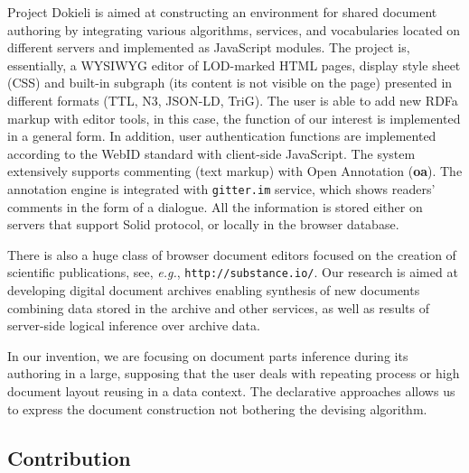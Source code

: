 \documentclass[conference,a4paper]{IEEEtran}
\providecommand\url[1]{\texttt{#1}}
\begin{document}
Project Dokieli \cite{b14} is aimed at constructing an environment for shared document authoring by integrating various algorithms, services, and vocabularies located on different servers and implemented as JavaScript modules.  The project is, essentially, a WYSIWYG editor of LOD-marked HTML pages, display style sheet (CSS) and built-in subgraph (its content is not visible on the page) presented in different formats (TTL, N3, JSON-LD, TriG).  The user is able to add new RDFa markup with editor tools, in this case, the function of our interest is implemented in a general form.  In addition, user authentication functions are implemented according to the WebID standard with client-side JavaScript.  The system extensively supports commenting (text markup) with Open Annotation (\textbf{oa}).  The annotation engine is integrated with \texttt{gitter.im} service, which shows readers' comments in the form of a dialogue.  All the information is stored either on servers that support Solid protocol, or locally in the browser database.

There is also a huge class of browser document editors focused on the creation of scientific publications, see, \textit{e.g.}, \url{http://substance.io/}.
Our research is aimed at developing digital document archives enabling synthesis of new documents combining data stored in the archive and other services, as well as results of server-side logical inference over archive data.

In our invention, we are focusing on document parts inference during its authoring in a large, supposing that the user deals with repeating process or high document layout reusing in a data context.  The declarative approaches allows us to express the document construction not bothering the devising algorithm.

\subsection{Contribution}
\label{sec:contr}
\end{document}
